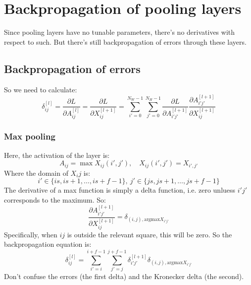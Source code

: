 \documentclass[12pt, a4paper]{article}
\numberwithin{equation}{section}
\begin{document}
\section{Backpropagation of pooling layers}
Since pooling layers have no tunable parameters, there's no derivatives with respect to such. But there's still backpropagation of errors through these layers.

\subsection{Backpropagation of errors}
So we need to calculate:
\begin{equation}
\delta^{[l]}_{ij}=\frac{\partial L}{\partial A^{[l]}_{ij}}=\frac{\partial L}{\partial X^{[l+1]}_{ij}}=\sum_{i'=0}^{N_W-1}\sum_{j'=0}^{N_H-1}\frac{\partial L}{\partial A^{[l+1]}_{i'j'}}\frac{\partial A^{[l+1]}_{i'j'}}{\partial X^{[l+1]}_{ij}}
\end{equation}

\subsubsection{Max pooling}
Here, the activation of the layer is:
\begin{equation}
A_{ij}=\max X_{ij}(i',j'),\quad X_{ij}(i',j')=X_{i',j'}
\end{equation}
Where the domain of $X_ij$ is:
\begin{equation}
i'\in\{is,is+1,\ldots,is+f-1\},\ j'\in\{js,js+1,\ldots,js+f-1\}
\end{equation}
The derivative of a max function is simply a delta function, i.e. zero unluess $i'j'$ corresponds to the maximum. So:
\begin{equation}
\frac{\partial A^{[l+1]}_{i'j'}}{\partial X^{[l+1]}_{ij}}=\delta_{(i,j),\textrm{argmax}X_{i'j'}}
\end{equation}
Specifically, when $ij$ is outside the relevant square, this will be zero. So the backpropagation equation is:
\begin{equation}
\delta^{[l]}_{ij}=\sum_{i'=i}^{i+f-1}\sum_{j'=j}^{j+f-1}\delta^{[l+1]}_{i'j'}\delta_{(i,j),\textrm{argmax}X_{i'j'}}
\end{equation}
Don't confuse the errors (the first delta) and the Kronecker delta (the second).
\end{document}

